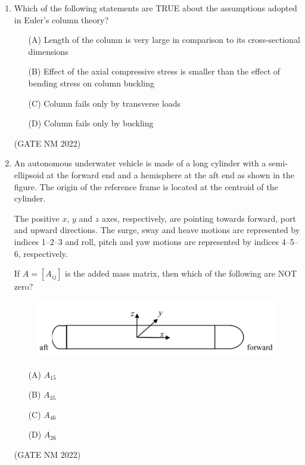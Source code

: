 \documentclass[journal,12pt,onecolumn]{IEEEtran}
\theoremstyle{remark}
\begin{document}
\begin{enumerate}
\item  Which of the following statements are TRUE about the assumptions adopted in Euler's column theory?  

\begin{enumerate}
    \item[(A)] Length of the column is very large in comparison to its cross-sectional dimensions
    \item[(B)] Effect of the axial compressive stress is smaller than the effect of bending stress on column buckling
    \item[(C)] Column fails only by transverse loads
    \item[(D)] Column fails only by buckling
\end{enumerate}

\hfill(GATE NM 2022)


\item  An autonomous underwater vehicle is made of a long cylinder with a semi-ellipsoid at the forward end and a hemisphere at the aft end as shown in the figure.  
The origin of the reference frame is located at the centroid of the cylinder.  

The positive $x$, $y$ and $z$ axes, respectively, are pointing towards forward, port and upward directions.  
The surge, sway and heave motions are represented by indices 1--2--3 and roll, pitch and yaw motions are represented by indices 4--5--6, respectively.  

If $A = [A_{ij}]$ is the added mass matrix, then which of the following are NOT zero?

\begin{figure}[h]
	\centering
	\includegraphics[width=0.6\columnwidth]{fig6}
	\caption{}
	\label{fig:placeholder}
\end{figure}

\begin{enumerate}
    \item[(A)]  $A_{15}$
    \item[(B)]  $A_{35}$
    \item[(C)]  $A_{46}$
    \item[(D)]  $A_{26}$
\end{enumerate}

\hfill(GATE NM 2022)




\end{enumerate}
\end{document}

